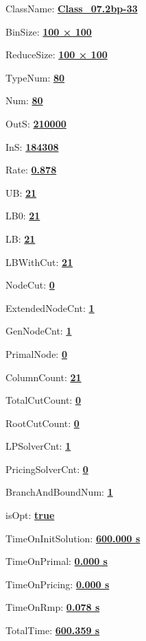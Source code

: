 \documentclass[11pt]{article}
\begin{document}
\pagestyle{empty}


ClassName: \underline{\textbf{Class_07.2bp-33}}
\par
BinSize: \underline{\textbf{100 × 100}}
\par
ReduceSize: \underline{\textbf{100 × 100}}
\par
TypeNum: \underline{\textbf{80}}
\par
Num: \underline{\textbf{80}}
\par
OutS: \underline{\textbf{210000}}
\par
InS: \underline{\textbf{184308}}
\par
Rate: \underline{\textbf{0.878}}
\par
UB: \underline{\textbf{21}}
\par
LB0: \underline{\textbf{21}}
\par
LB: \underline{\textbf{21}}
\par
LBWithCut: \underline{\textbf{21}}
\par
NodeCut: \underline{\textbf{0}}
\par
ExtendedNodeCnt: \underline{\textbf{1}}
\par
GenNodeCnt: \underline{\textbf{1}}
\par
PrimalNode: \underline{\textbf{0}}
\par
ColumnCount: \underline{\textbf{21}}
\par
TotalCutCount: \underline{\textbf{0}}
\par
RootCutCount: \underline{\textbf{0}}
\par
LPSolverCnt: \underline{\textbf{1}}
\par
PricingSolverCnt: \underline{\textbf{0}}
\par
BranchAndBoundNum: \underline{\textbf{1}}
\par
isOpt: \underline{\textbf{true}}
\par
TimeOnInitSolution: \underline{\textbf{600.000 s}}
\par
TimeOnPrimal: \underline{\textbf{0.000 s}}
\par
TimeOnPricing: \underline{\textbf{0.000 s}}
\par
TimeOnRmp: \underline{\textbf{0.078 s}}
\par
TotalTime: \underline{\textbf{600.359 s}}
\par
\newpage


\end{document}
